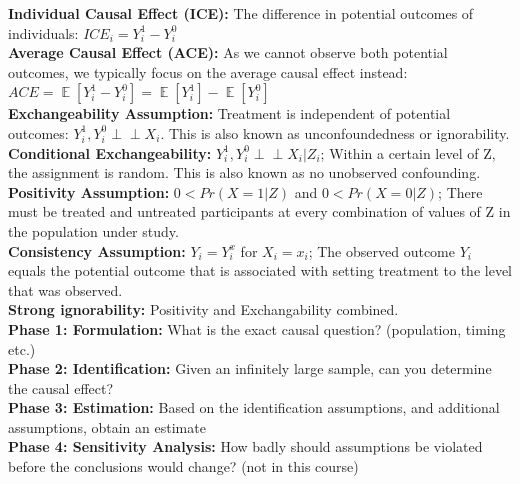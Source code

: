 \documentclass[a4paper,7pt,landscape]{extarticle}
\newcommand{\indep}{\perp \!\!\! \perp} %
\DeclareMathOperator*{\E}{\mathbb{E}} %
\begin{document}
\begin{multicols}{3}
\begin{boxA}
\textbf{Individual Causal Effect (ICE):} The difference in potential outcomes of individuals: $ICE_i = Y_i^1-Y_i^0$\\
\textbf{Average Causal Effect (ACE):} As we cannot observe both potential outcomes, we typically focus on the average causal effect instead: $ACE = \E [Y_i^1-Y_i^0] = \E [Y_i^1]- \E [Y_i^0]$\\
\textbf{Exchangeability Assumption:} Treatment is independent of potential outcomes: $Y_i^1, Y_i^0 \indep X_i$. This is also known as unconfoundedness or ignorability.\\
\textbf{Conditional Exchangeability:} $Y_i^1, Y_i^0 \indep X_i | Z_i$; Within a certain level of Z, the assignment is random. This is also known as no unobserved confounding.\\
\textbf{Positivity Assumption:} $0 < Pr(X = 1|Z)$ and $0 < Pr(X = 0|Z)$; There must be treated and untreated participants at every combination of values of Z in the population under study.\\
\textbf{Consistency Assumption:} $Y_i=Y_i^x$ for $X_i=x_i$; The observed outcome $Y_i$ equals the potential outcome that is associated with setting treatment to the level that was observed.\\
\textbf{Strong ignorability:} Positivity and Exchangability combined.\\
\textbf{Phase 1: Formulation:} What is the exact causal question? (population, timing etc.)\\
\textbf{Phase 2: Identification:} Given an infinitely large sample, can you determine the causal effect?\\
\textbf{Phase 3: Estimation:} Based on the identification assumptions, and additional assumptions, obtain an estimate\\
\textbf{Phase 4: Sensitivity Analysis:} How badly should assumptions be violated before the conclusions would change? (not in this course)
    
\end{boxA}


\end{multicols}
\end{document}
